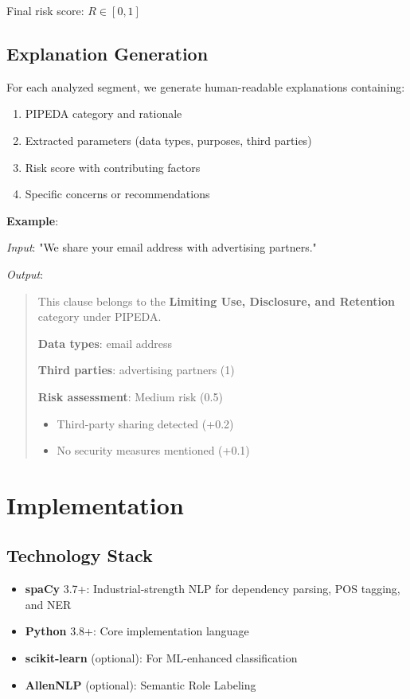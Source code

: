 \documentclass[conference]{IEEEtran}
\begin{document}
Final risk score: $R \in [0, 1]$

\subsection{Explanation Generation}

For each analyzed segment, we generate human-readable explanations containing:

\begin{enumerate}
    \item PIPEDA category and rationale
    \item Extracted parameters (data types, purposes, third parties)
    \item Risk score with contributing factors
    \item Specific concerns or recommendations
\end{enumerate}

\textbf{Example}:

\textit{Input}: "We share your email address with advertising partners."

\textit{Output}:
\begin{quote}
This clause belongs to the \textbf{Limiting Use, Disclosure, and Retention} category under PIPEDA. 

\textbf{Data types}: email address

\textbf{Third parties}: advertising partners (1)

\textbf{Risk assessment}: Medium risk (0.5)
\begin{itemize}
    \item Third-party sharing detected (+0.2)
    \item No security measures mentioned (+0.1)
\end{itemize}
\end{quote}

\section{Implementation}

\subsection{Technology Stack}

\begin{itemize}
    \item \textbf{spaCy} 3.7+: Industrial-strength NLP for dependency parsing, POS tagging, and NER
    \item \textbf{Python} 3.8+: Core implementation language
    \item \textbf{scikit-learn} (optional): For ML-enhanced classification
    \item \textbf{AllenNLP} (optional): Semantic Role Labeling
\end{itemize}
\end{document}
